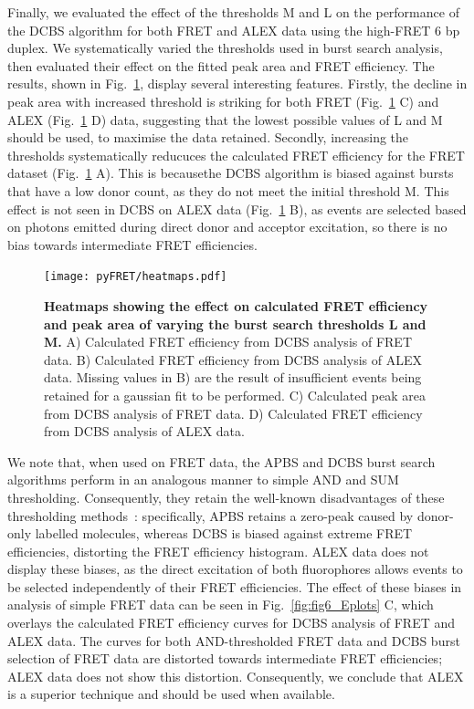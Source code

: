 Finally, we evaluated the effect of the thresholds M and L on the performance of the DCBS algorithm for both FRET and ALEX data using the high-FRET 6 bp duplex. We systematically varied the thresholds used in burst search analysis, then evaluated their effect on the fitted peak area and FRET efficiency. The results, shown in Fig.~\ref{fig:fig8_heatmaps}, display several interesting features. Firstly, the decline in peak area with increased threshold is striking for both FRET (Fig.~\ref{fig:fig8_heatmaps} C) and ALEX (Fig.~\ref{fig:fig8_heatmaps} D) data, suggesting that the lowest possible values of L and M should be used, to maximise the data retained. Secondly, increasing the thresholds systematically reducuces the calculated FRET efficiency for the FRET dataset (Fig.~\ref{fig:fig8_heatmaps} A). This is becausethe DCBS algorithm is biased against bursts that have a low donor count, as they do not meet the initial threshold M. This effect is not seen in DCBS on ALEX data (Fig.~\ref{fig:fig8_heatmaps} B), as events are selected based on photons emitted during direct donor and acceptor excitation, so there is no bias towards intermediate FRET efficiencies.

\begin{figure}[!ht]
   \begin{center}
      \texttt{[image: pyFRET/heatmaps.pdf]}
      \caption{{\bf Heatmaps showing the effect on calculated FRET efficiency and peak area of varying the burst search thresholds L and M.} A) Calculated FRET efficiency from DCBS analysis of FRET data. B) Calculated FRET efficiency from DCBS analysis of ALEX data. Missing values in B) are the result of insufficient events being retained for a gaussian fit to be performed. C) Calculated peak area from DCBS analysis of FRET data. D) Calculated FRET efficiency from DCBS analysis of ALEX data.}
      \label{fig:fig8_heatmaps}
   \end{center}
\end{figure}

We note that, when used on FRET data, the APBS and DCBS burst search algorithms perform in an analogous manner to simple AND and SUM thresholding. Consequently, they retain the well-known disadvantages of these thresholding methods~\cite{murphy14}: specifically, APBS retains a zero-peak caused by donor-only labelled molecules, whereas DCBS is biased against extreme FRET efficiencies, distorting the FRET efficiency histogram. ALEX data does not display these biases, as the direct excitation of both fluorophores allows events to be selected independently of their FRET efficiencies. The effect of these biases in analysis of simple FRET data can be seen in Fig.~\ref{fig:fig6_Eplots} C, which overlays the calculated FRET efficiency curves for DCBS analysis of FRET and ALEX data. The curves for both AND-thresholded FRET data and DCBS burst selection of FRET data are distorted towards intermediate FRET efficiencies; ALEX data does not show this distortion. Consequently, we conclude that ALEX is a superior technique and should be used when available.

